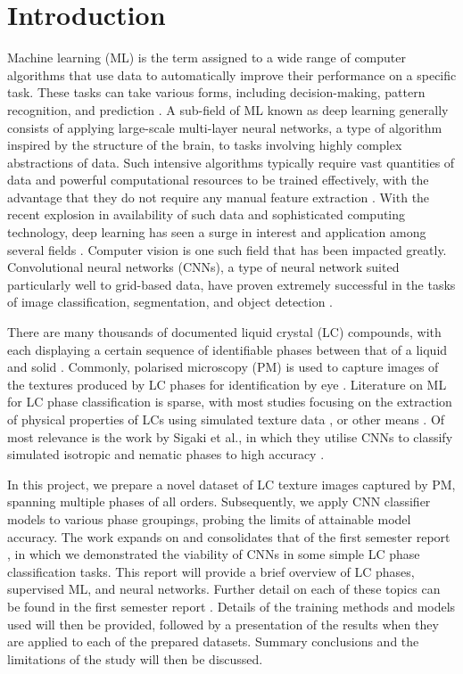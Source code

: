\documentclass[12pt]{article}
\begin{document}
\section{Introduction}
Machine learning (ML) is the term assigned to a wide range of computer algorithms that use data to automatically improve their performance on a specific task. These tasks can take various forms, including decision-making, pattern recognition, and prediction  \cite{Murphy12}. A sub-field of ML known as deep learning generally consists of applying large-scale multi-layer neural networks, a type of algorithm inspired by the structure of the brain, to tasks involving highly complex abstractions of data. Such intensive algorithms typically require vast quantities of data and powerful computational resources to be trained effectively, with the advantage that they do not require any manual feature extraction \cite{Goodfellow16}. With the recent explosion in availability of such data and sophisticated computing technology, deep learning has seen a surge in interest and application among several fields \cite{Shrestha19}. Computer vision is one such field that has been impacted greatly. Convolutional neural networks (CNNs), a type of neural network suited particularly well to grid-based data, have proven extremely successful in the tasks of image classification, segmentation, and object detection \cite{Voulodimos18}.

There are many thousands of documented liquid crystal (LC) compounds, with each displaying a certain sequence of identifiable phases between that of a liquid and solid \cite{Dierking03}. Commonly, polarised microscopy (PM) is used to capture images of the textures produced by LC phases for identification by eye \cite{Dierking03}. Literature on ML for LC phase classification is sparse, with most studies focusing on the extraction of physical properties of LCs using simulated texture data \cite{Sigaki20, Sigaki19, Minor20, Walters19}, or other means \cite{Florin07, Butnariu13, Doi19, Inokuchi20}. Of most relevance is the work by Sigaki et al., in which they utilise CNNs to classify simulated isotropic and nematic phases to high accuracy \cite{Sigaki20}.

In this project, we prepare a novel dataset of LC texture images captured by PM, spanning multiple phases of all orders. Subsequently, we apply CNN classifier models to various phase groupings, probing the limits of attainable model accuracy. The work expands on and consolidates that of the first semester report \cite{Heaton20}, in which we demonstrated the viability of CNNs in some simple LC phase classification tasks. This report will provide a brief overview of LC phases, supervised ML, and neural networks. Further detail on each of these topics can be found in the first semester report \cite{Heaton20}. Details of the training methods and models used will then be provided, followed by a presentation of the results when they are applied to each of the prepared datasets. Summary conclusions and the limitations of the study will then be discussed.
\end{document}

